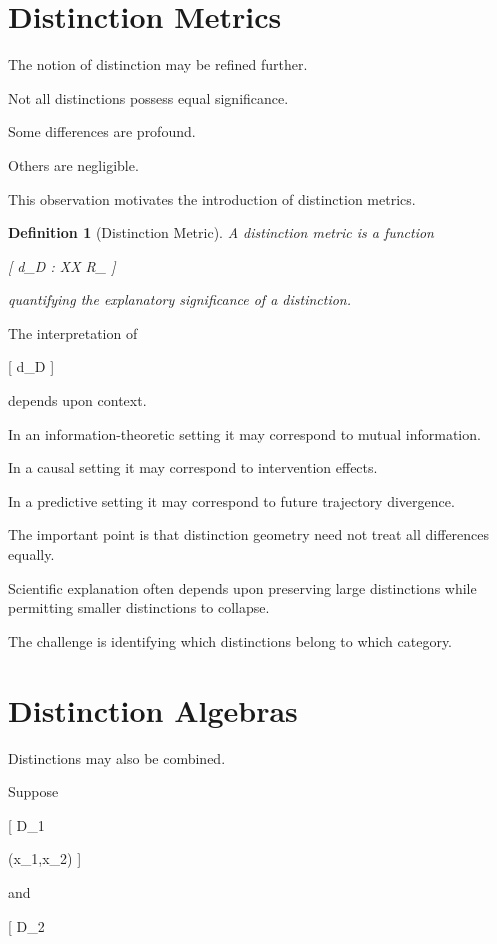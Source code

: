 \documentclass[11pt,oneside,openany]{book}
\newtheorem{definition}{Definition}[chapter] \newtheorem{theorem}{Theorem}[chapter] \newtheorem{proposition}{Proposition}[chapter] \newtheorem{lemma}{Lemma}[chapter] \newtheorem{corollary}{Corollary}[chapter] \newtheorem{remark}{Remark}[chapter]
\begin{document}
\section{Distinction Metrics}

The notion of distinction may be refined further.

Not all distinctions possess equal significance.

Some differences are profound.

Others are negligible.

This observation motivates the introduction of distinction metrics.

\begin{definition}[Distinction Metric]

A distinction metric is a function

[
d_D :
\mathcal X\times\mathcal X
\rightarrow
\mathbb R_{}
]

quantifying the explanatory significance of a distinction.

\end{definition}

The interpretation of

[
d_D
]

depends upon context.

In an information-theoretic setting it may correspond to mutual information.

In a causal setting it may correspond to intervention effects.

In a predictive setting it may correspond to future trajectory divergence.

The important point is that distinction geometry need not treat all differences equally.

Scientific explanation often depends upon preserving large distinctions while permitting smaller distinctions to collapse.

The challenge is identifying which distinctions belong to which category.

\section{Distinction Algebras}

Distinctions may also be combined.

Suppose

[
D_1

(x_1,x_2)
]

and

[
D_2
\end{document}
